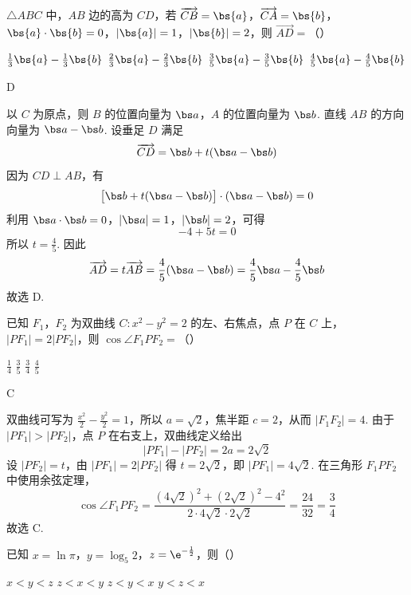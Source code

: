 \begin{problem}
\(\triangle ABC\) 中，\(AB\) 边的高为 \(CD\)，若 \(\overrightarrow{CB} = \bs{a}\)，\(\overrightarrow{CA} = \bs{b}\)，\(\bs{a} \cdot \bs{b} = 0\)，\(|\bs{a}| = 1\)，\(|\bs{b}| = 2\)，则 \(\overrightarrow{AD} =\)（\quad）

\choices
    {\(\frac{1}{3}\bs{a} - \frac{1}{3}\bs{b}\)}
    {\(\frac{2}{3}\bs{a} - \frac{2}{3}\bs{b}\)}
    {\(\frac{3}{5}\bs{a} - \frac{3}{5}\bs{b}\)}
    {\(\frac{4}{5}\bs{a} - \frac{4}{5}\bs{b}\)}
\end{problem}

\begin{answer}
D
\end{answer}

\begin{solution}
以 \(C\) 为原点，则 \(B\) 的位置向量为 \(\bs a\)，\(A\) 的位置向量为 \(\bs b\). 直线 \(AB\) 的方向向量为 \(\bs a-\bs b\). 设垂足 \(D\) 满足
\[
\overrightarrow{CD}=\bs b+t(\bs a-\bs b)
\]
因为 \(CD\perp AB\)，有
\[
\bigl[\bs b+t(\bs a-\bs b)\bigr]\cdot(\bs a-\bs b)=0
\]
利用 \(\bs a\cdot\bs b=0\)，\(|\bs a|=1\)，\(|\bs b|=2\)，可得
\[
-4+5t=0
\]
所以 \(t=\frac45\). 因此
\[
\overrightarrow{AD}=t\overrightarrow{AB}=\frac45(\bs a-\bs b)=\frac45\bs a-\frac45\bs b
\]
故选 D.
\end{solution}

\begin{problem}
已知 \(F_{1}\)，\(F_{2}\) 为双曲线 \(C: x^{2} - y^{2} = 2\) 的左、右焦点，点 \(P\) 在 \(C\) 上，\(|PF_{1}| = 2|PF_{2}|\)，则 \(\cos \angle F_{1}PF_{2} =\)（\quad）

\choices
    {\(\frac{1}{4}\)}
    {\(\frac{3}{5}\)}
    {\(\frac{3}{4}\)}
    {\(\frac{4}{5}\)}
\end{problem}

\begin{answer}
C
\end{answer}

\begin{solution}
双曲线可写为 \(\frac{x^2}{2}-\frac{y^2}{2}=1\)，所以 \(a=\sqrt2\)，焦半距 \(c=2\)，从而 \(|F_1F_2|=4\). 由于 \(|PF_1|>|PF_2|\)，点 \(P\) 在右支上，双曲线定义给出
\[
|PF_1|-|PF_2|=2a=2\sqrt2
\]
设 \(|PF_2|=t\)，由 \(|PF_1|=2|PF_2|\) 得 \(t=2\sqrt2\)，即 \(|PF_1|=4\sqrt2\). 在三角形 \(F_1PF_2\) 中使用余弦定理，
\[
\cos\angle F_1PF_2
=\frac{(4\sqrt2)^2+(2\sqrt2)^2-4^2}{2\cdot4\sqrt2\cdot2\sqrt2}
=\frac{24}{32}=\frac34
\]
故选 C.
\end{solution}

\begin{problem}
已知 \(x = \ln \pi\)，\(y = \log_5 2\)，\(z = \e^{-\frac{1}{2}}\)，则（\quad）

\choices
    {\(x < y < z\)}
    {\(z < x < y\)}
    {\(z < y < x\)}
    {\(y < z < x\)}
\end{problem}

